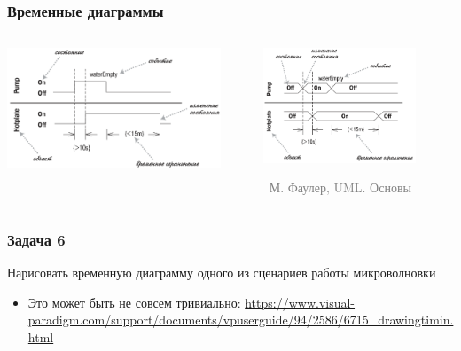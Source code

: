 \documentclass[xetex,mathserif,serif]{beamer}
\newcommand{\attribution}[1] {
	\vspace{-5mm}\begin{flushright}\begin{scriptsize}\textcolor{gray}{\textcopyright\, #1}\end{scriptsize}\end{flushright}
}
\begin{document}
	\begin{frame}
		\frametitle{Временные диаграммы}
		\begin{columns}
			\begin{column}{0.5\textwidth}
				\begin{center}
					\includegraphics[width=0.9\textwidth]{timingDiagrams.png}
				\end{center}
			\end{column}
			\begin{column}{0.5\textwidth}
				\begin{center}
					\includegraphics[width=0.8\textwidth]{timingDiagramsAlternate.png}
					\attribution{М. Фаулер, UML. Основы}
				\end{center}
			\end{column}
		\end{columns}
	\end{frame}

	\begin{frame}
		\frametitle{Задача 6}
		Нарисовать временную диаграмму одного из сценариев работы микроволновки
		\begin{itemize}
			\item Это может быть не совсем тривиально: \url{https://www.visual-paradigm.com/support/documents/vpuserguide/94/2586/6715_drawingtimin.html}
		\end{itemize}
	\end{frame}
\end{document}
